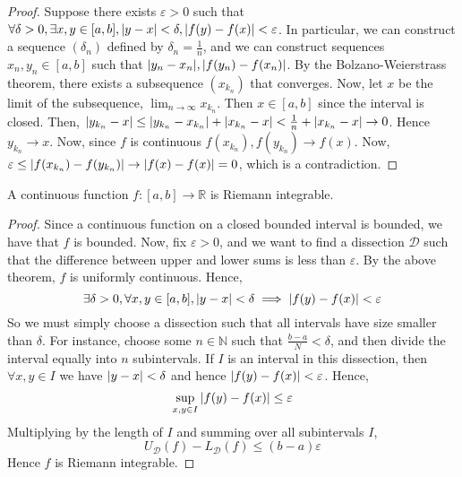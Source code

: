 \begin{proof}
Suppose there exists \( \varepsilon > 0 \) such that \( \forall \delta > 0, \exists x,y \in [a,b], \abs{y-x} < \delta, \abs{f(y)-f(x)} < \varepsilon \).
In particular, we can construct a sequence \( (\delta_n) \) defined by \( \delta_n = \frac{1}{n} \), and we can construct sequences \( x_n, y_n \in [a,b] \) such that \( \abs{y_n-x_n}, \abs{f(y_n) - f(x_n)} \).
By the Bolzano-Weierstrass theorem, there exists a subsequence \( (x_{k_n}) \) that converges.
Now, let \( x \) be the limit of the subsequence, \( \lim_{n \to \infty} x_{k_n} \).
Then \( x \in [a,b] \) since the interval is closed.
Then, \( \abs{y_{k_n} - x} \leq \abs{y_{k_n} - x_{k_n}} + \abs{x_{k_n} - x} < \frac{1}{n} + \abs{x_{k_n} - x} \to 0 \).
Hence \( y_{k_n} \to x \).
Now, since \( f \) is continuous \( f(x_{k_n}), f(y_{k_n}) \to f(x) \).
Now, \( \varepsilon \leq \abs{f(x_{k_n}) - f(y_{k_n})} \to \abs{f(x) - f(x)} = 0 \), which is a contradiction.
\end{proof}
\begin{corollary}
A continuous function \( f \colon [a,b] \to \mathbb R \) is Riemann integrable.
\end{corollary}
\begin{proof}
Since a continuous function on a closed bounded interval is bounded, we have that \( f \) is bounded.
Now, fix \( \varepsilon > 0 \), and we want to find a dissection \( \mathcal D \) such that the difference between upper and lower sums is less than \( \varepsilon \).
By the above theorem, \( f \) is uniformly continuous.
Hence,
\[ \exists \delta > 0, \forall x, y \in [a,b], \abs{y-x} < \delta \implies \abs{f(y) - f(x)} < \varepsilon \]
So we must simply choose a dissection such that all intervals have size smaller than \( \delta \).
For instance, choose some \( n \in \mathbb N \) such that \( \frac{b-a}{N} < \delta \), and then divide the interval equally into \( n \) subintervals.
If \( I \) is an interval in this dissection, then \( \forall x,y \in I \) we have \( \abs{y-x} < \delta \) and hence \( \abs{f(y) - f(x)} < \varepsilon \).
Hence,
\[ \sup_{x,y \in I} \abs{f(y) - f(x)} \leq \varepsilon \]
Multiplying by the length of \( I \) and summing over all subintervals \( I \),
\[ U_{\mathcal D}(f) - L_{\mathcal D}(f) \leq (b-a) \varepsilon \]
Hence \( f \) is Riemann integrable.
\end{proof}

